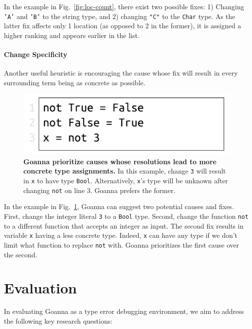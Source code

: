 \documentclass[pdflatex,lineno,sn-nature,Numbered]{sn-jnl}%
\begin{document}
    In the example in Fig.~\ref{fig:loc-count}, there exist two possible fixes: 1) Changing \texttt{'A'} and \texttt{'B'} to the string type, and 2) changing \texttt{"C"} to the \texttt{Char} type. As the latter fix affects only 1 location (as opposed to 2 in the former), it is assigned a higher ranking and appears earlier in the list.

    \paragraph{Change Specificity}
	Another useful heuristic is encouraging the cause whose fix will result in every surrounding term being as concrete as possible.
	
	
   \begin{figure}[ht!]
        \centering
        \includegraphics[width=0.5\linewidth]{images/Specificity}
        \caption[Goanna prioritize causes whose resolutions lead to more concrete type assignments]{\textbf{Goanna prioritize causes whose resolutions lead to more concrete type assignments.} In this example, change \texttt{3} will result in \texttt{x} to have type \texttt{Bool}. Alternatively, \texttt{x}'s type will be unknown after changing \texttt{not} on line 3. Goanna prefers the former.} 
        \label{fig:specificity}
    \end{figure}

    In the example in Fig.~\ref{fig:specificity}, Goanna can suggest two potential causes and fixes. First, change the integer literal \texttt{3} to a \texttt{Bool} type. Second, change the function \texttt{not} to a different function that accepts an integer as input. The second fix results in variable \texttt{x} having a less concrete type. Indeed, \texttt{x} can have any type if we don't limit what function to replace \texttt{not} with. Goanna prioritizes the first cause over the second. 

    
       
\section{Evaluation} \label{sec:evaluation}

In evaluating Goanna as a type error debugging environment, we aim to address the following key research questions:
\end{document}
